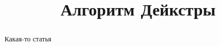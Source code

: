 \documentclass[9pt, letterpaper, twocolumn]{article}
\title{Алгоритм Дейкстры}
\begin{document}
\begin{titlepage}
    \maketitle
    \begin{abstract}
        Какая-то статья
    \end{abstract}
    \listoffigures
    \tableofcontents
\end{titlepage}






\end{document}
